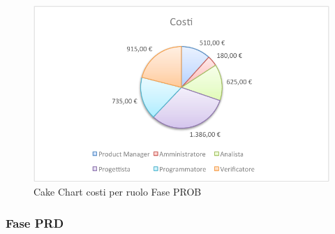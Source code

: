 				\begin{figure}[H]\centering
					\includegraphics[width=\textwidth]{PianoDiProgetto/Pics/ChartTotCostiFasePROB.pdf}
					\caption{Cake Chart costi per ruolo Fase PROB}
				\end{figure}
		\subsubsection{Fase PRD}
